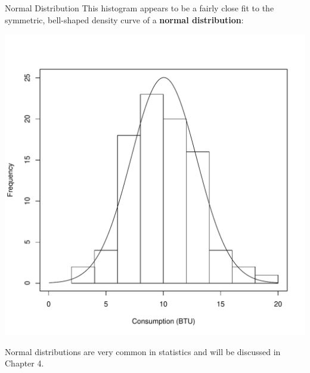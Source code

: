 \documentclass{beamer}
\renewcommand{\emph}{\textbf}
\begin{document}
\begin{frame}{Normal Distribution}
This histogram appears to be a fairly close fit to the symmetric, bell-shaped density curve of a \emph{normal distribution}:
\begin{center}
\vspace{-.5cm}
\includegraphics[scale=.35]{ch01_power_normal.pdf}
\end{center}
Normal distributions are very common in statistics and will be discussed in Chapter 4.
\end{frame}


%
%
\end{document}
